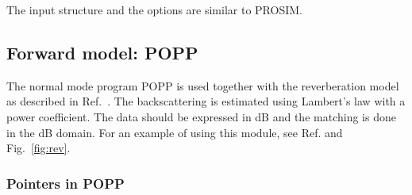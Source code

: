 \documentclass{saclantc}
\begin{document}
The input structure and the options are similar to {\sc PROSIM}.

\subsection{Forward model: POPP }

The normal mode program {\sf POPP} is used together with the reverberation 
model as described in Ref.\ \cite{ellis:asa95}.
The backscattering is estimated using Lambert's law  with a power coefficient.
The data should be expressed in dB and the matching is done in the dB domain.
For an example of using this module, see Ref. \cite{ellis:ecua3} and
Fig.\ \ref{fig:rev}.

\subsubsection{Pointers in POPP}
\label{se:popppoint}
\end{document}
